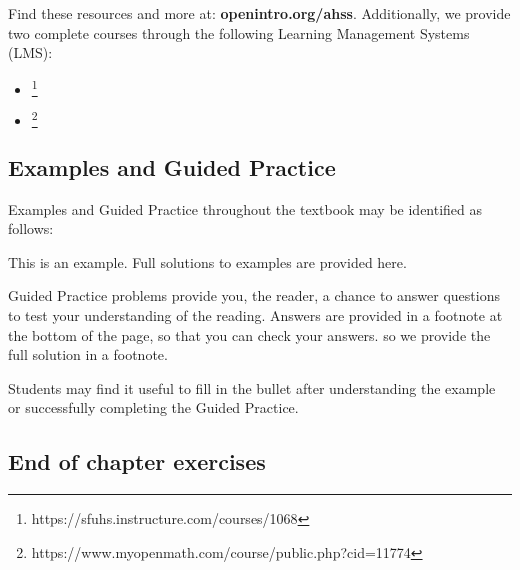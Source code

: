 \noindent Find these resources and more at: 
    {\color{black}\textbf{openintro.org/ahss}}.   Additionally, we provide two complete courses through the following Learning Management Systems (LMS):

\begin{itemize} 
\item {}\footnote{https://sfuhs.instructure.com/courses/1068} 
\item {}\footnote{https://www.myopenmath.com/course/public.php?cid=11774} 
\end{itemize}

\subsection*{Examples and Guided Practice}

\noindent%
Examples and Guided Practice throughout the textbook may be
identified as follows:



\begin{examplewrap}
\begin{nexample}{This is an example.}
   Full solutions to examples are provided here.
\end{nexample}
\end{examplewrap}

\begin{exercisewrap}
\begin{nexercise}
Guided Practice problems provide you, the reader, a chance to answer questions to test your understanding of the reading.  Answers are provided in a footnote at the bottom of the page, so that you can check your answers.
so we provide the full solution in a footnote.\footnotemark{}
\end{nexercise}
\end{exercisewrap}

Students may find it useful to fill in the bullet after understanding the example or successfully completing the Guided Practice.

\subsection*{End of chapter exercises}

